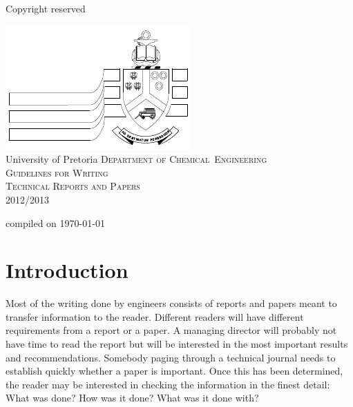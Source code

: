 \documentclass[a5paper, 10pt]{article}
\begin{document}
\begin{titlepage}
  \begin{centering}
    \begin{flushright}Copyright reserved\end{flushright}
    \vfil
    \includegraphics{uplogo}\\
    \textsf{University of Pretoria}
    \vfil
    {\Huge\scshape
    Department of Chemical~Engineering\\
    \vfil
    Guidelines for Writing \\ Technical Reports and Papers\\}
  \vfil
  2012/2013 \\
  \vfil
  \begin{flushright}\small{compiled on \today}\end{flushright}
\end{centering}

\end{titlepage}

\pagestyle{empty}

\cleardoublepage

\setcounter{page}{1}
\pagestyle{plain}
\tableofcontents
\newpage

\pagestyle{empty}
\cleardoublepage
\setcounter{page}{1}
\pagestyle{plain}

\section{Introduction}
\label{cha:introduction}
Most of the writing done by engineers consists of reports and papers
meant to transfer information to the reader.  Different readers will
have different requirements from a report or a paper.  A managing
director will probably not have time to read the report but will be
interested in the most important results and recommendations.
Somebody paging through a technical journal needs to establish quickly
whether a paper is important.  Once this has been determined, the
reader may be interested in checking the information in the finest
detail: What was done?  How was it done?  What was it done with?
\end{document}
